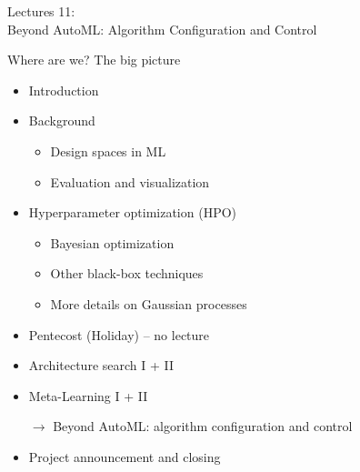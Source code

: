 \begin{frame}[c]{}

\centering
\huge
Lectures 11:\\
Beyond AutoML: Algorithm Configuration and Control
\end{frame}
\begin{frame}[c]{Where are we? The big picture}

\begin{itemize}
	\item Introduction
	\item Background
	\begin{itemize}
		\item Design spaces in ML
		\item Evaluation and visualization
	\end{itemize}
	\item Hyperparameter optimization (HPO)
	\begin{itemize}
		\item Bayesian optimization
		\item Other black-box techniques
		\item More details on Gaussian processes
	\end{itemize}
	\item Pentecost (Holiday) -- no lecture
	\item Architecture search I + II
	\item Meta-Learning I + II
	\item[$\to$] Beyond AutoML: algorithm configuration and control
	\item Project announcement and closing
\end{itemize}

\end{frame}

